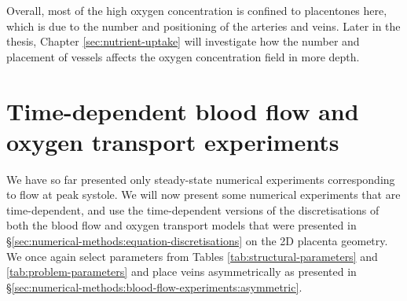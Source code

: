         Overall, most of the high oxygen concentration is confined to placentones here, which is due to the number and positioning of the arteries and veins. Later in the thesis, Chapter \ref{sec:nutrient-uptake} will investigate how the number and placement of vessels affects the oxygen concentration field in more depth.

    \section{Time-dependent blood flow and oxygen transport experiments} \label{sec:numerical-methods:time-dependent-experiments}
        We have so far presented only steady-state numerical experiments corresponding to flow at peak systole. We will now present some numerical experiments that are time-dependent, and use the time-dependent versions of the discretisations of both the blood flow and oxygen transport models that were presented in \S\ref{sec:numerical-methods:equation-discretisations} on the 2D placenta geometry. We once again select parameters from Tables \ref{tab:structural-parameters} and \ref{tab:problem-parameters} and place veins asymmetrically as presented in \S\ref{sec:numerical-methods:blood-flow-experiments:asymmetric}.
        
